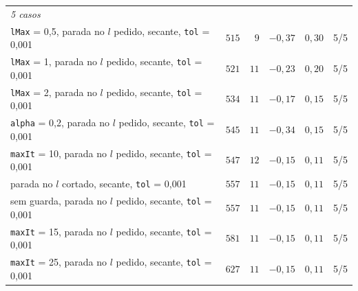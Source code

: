 \documentclass[11pt,a4paper]{article}
\numberwithin{equation}{section}
\begin{document}
{\begin{longtable}{p{7.8cm}rrrrc}
\multicolumn{6}{l}{\textit{5 casos}} \\
\texttt{lMax} = 0,5, parada no $l$ pedido, secante, \texttt{tol} = 0,001 & $515$ & $9$ & $-0{,}37$ & $0{,}30$ & 5/5 \\
\texttt{lMax} = 1, parada no $l$ pedido, secante, \texttt{tol} = 0,001 & $521$ & $11$ & $-0{,}23$ & $0{,}20$ & 5/5 \\
\texttt{lMax} = 2, parada no $l$ pedido, secante, \texttt{tol} = 0,001 & $534$ & $11$ & $-0{,}17$ & $0{,}15$ & 5/5 \\
\texttt{alpha} = 0,2, parada no $l$ pedido, secante, \texttt{tol} = 0,001 & $545$ & $11$ & $-0{,}34$ & $0{,}15$ & 5/5 \\
\texttt{maxIt} = 10, parada no $l$ pedido, secante, \texttt{tol} = 0,001 & $547$ & $12$ & $-0{,}15$ & $0{,}11$ & 5/5 \\
parada no $l$ cortado, secante, \texttt{tol} = 0,001 & $557$ & $11$ & $-0{,}15$ & $0{,}11$ & 5/5 \\
sem guarda, parada no $l$ pedido, secante, \texttt{tol} = 0,001 & $557$ & $11$ & $-0{,}15$ & $0{,}11$ & 5/5 \\
\texttt{maxIt} = 15, parada no $l$ pedido, secante, \texttt{tol} = 0,001 & $581$ & $11$ & $-0{,}15$ & $0{,}11$ & 5/5 \\
\texttt{maxIt} = 25, parada no $l$ pedido, secante, \texttt{tol} = 0,001 & $627$ & $11$ & $-0{,}15$ & $0{,}11$ & 5/5 \\
\end{longtable}
}
\end{document}
